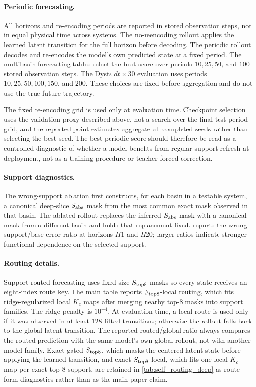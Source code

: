 \paragraph{Periodic forecasting.}
All horizons and re-encoding periods are reported in stored observation steps, not in equal physical time across systems. The no-reencoding rollout applies the learned latent transition for the full horizon before decoding. The periodic rollout decodes and re-encodes the model's own predicted state at a fixed period. The multibasin forecasting tables select the best score over periods $10,25,50$, and $100$ stored observation steps. The Dysts $dt{\times}30$ evaluation uses periods $10,25,50,100,150$, and $200$. These choices are fixed before aggregation and do not use the true future trajectory.

The fixed re-encoding grid is used only at evaluation time. Checkpoint selection uses the validation proxy described above, not a search over the final test-period grid, and the reported point estimates aggregate all completed seeds rather than selecting the best seed. The best-periodic score should therefore be read as a controlled diagnostic of whether a model benefits from regular support refresh at deployment, not as a training procedure or teacher-forced correction.

\paragraph{Support diagnostics.}
The wrong-support ablation first constructs, for each basin in a testable system, a canonical deep-slice \(S_{\rm abs}\) mask from the most common exact mask observed in that basin. The ablated rollout replaces the inferred \(S_{\rm abs}\) mask with a canonical mask from a different basin and holds that replacement fixed.  reports the wrong-support/base error ratio at horizons $H1$ and $H20$; larger ratios indicate stronger functional dependence on the selected support.

\paragraph{Routing details.}
Support-routed forecasting uses fixed-size \(S_{\rm top8}\) masks so every state receives an eight-index route key. The main table reports \(F_{\rm top8}\)-local routing, which fits ridge-regularized local \(K_c\) maps after merging nearby top-\(8\) masks into support families. The ridge penalty is $10^{-4}$. At evaluation time, a local route is used only if it was observed in at least $128$ fitted transitions; otherwise the rollout falls back to the global latent transition. The reported routed/global ratio always compares the routed prediction with the same model's own global rollout, not with another model family. Exact gated \(S_{\rm top8}\), which masks the centered latent state before applying the learned transition, and exact \(S_{\rm top8}\)-local, which fits one local \(K_c\) map per exact top-\(8\) support, are retained in \cref{tab:self_routing_deep} as route-form diagnostics rather than as the main paper claim.

